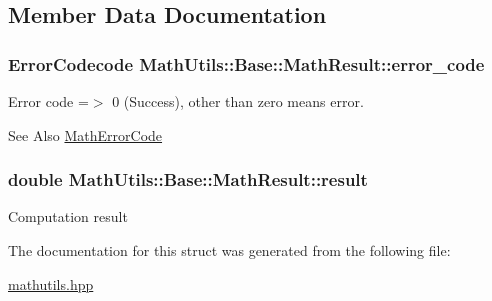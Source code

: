 \subsection{Member Data Documentation}
\hypertarget{structMathUtils_1_1Base_1_1MathResult_a1100d7bbaef7f1aa1f0159605d751f5c}{
\subsubsection[{error\-\_\-code}]{\setlength{\rightskip}{0pt plus 5cm}Error\-Codecode Math\-Utils\-::\-Base\-::\-Math\-Result\-::error\-\_\-code}}\label{structMathUtils_1_1Base_1_1MathResult_a1100d7bbaef7f1aa1f0159605d751f5c}
Error code =$>$ 0 (Success), other than zero means error. \begin{DoxySeeAlso}{See Also}
\hyperlink{namespaceMathUtils_1_1Base_aac4088d82202217a0cea2b81ec0649a2}{Math\-Error\-Code} 
\end{DoxySeeAlso}
\hypertarget{structMathUtils_1_1Base_1_1MathResult_a34d7a174fdb6a8ace3fff2fa7d43ee05}{
\subsubsection[{result}]{\setlength{\rightskip}{0pt plus 5cm}double Math\-Utils\-::\-Base\-::\-Math\-Result\-::result}}\label{structMathUtils_1_1Base_1_1MathResult_a34d7a174fdb6a8ace3fff2fa7d43ee05}
Computation result 

The documentation for this struct was generated from the following file\-:\begin{DoxyCompactItemize}
\item 
\hyperlink{mathutils_8hpp}{mathutils.\-hpp}\end{DoxyCompactItemize}

